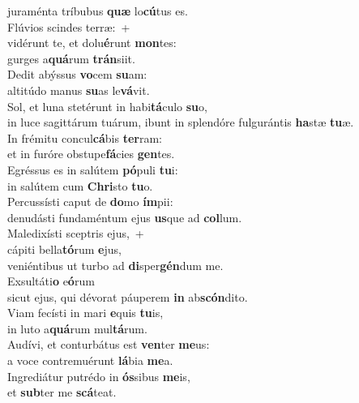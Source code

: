 \evenverse juraménta tríbubus \textbf{quæ} lo\textbf{cú}tus es.\\
\oddverse Flúvios scindes terræ:~+\\
\oddverse  vidérunt te, et dolu\textbf{é}runt \textbf{mon}tes:~\*\\
\oddverse gurges a\textbf{quá}rum \textbf{trán}siit.\\
\evenverse Dedit abýssus \textbf{vo}cem \textbf{su}am:~\*\\
\evenverse altitúdo manus \textbf{su}as le\textbf{vá}vit.\\
\oddverse Sol, et luna stetérunt in habi\textbf{tá}culo \textbf{su}o,~\*\\
\oddverse in luce sagittárum tuárum, ibunt in splendóre fulgurántis \textbf{ha}stæ \textbf{tu}æ.\\
\evenverse In frémitu concul\textbf{cá}bis \textbf{ter}ram:~\*\\
\evenverse et in furóre obstupe\textbf{fá}cies \textbf{gen}tes.\\
\oddverse Egréssus es in salútem \textbf{pó}puli \textbf{tu}i:~\*\\
\oddverse in salútem cum \textbf{Chri}sto \textbf{tu}o.\\
\evenverse Percussísti caput de \textbf{do}mo \textbf{ím}pii:~\*\\
\evenverse denudásti fundaméntum ejus \textbf{us}que ad \textbf{col}lum.\\
\oddverse Maledixísti sceptris ejus,~+\\
\oddverse  cápiti bella\textbf{tó}rum \textbf{e}jus,~\*\\
\oddverse veniéntibus ut turbo ad \textbf{di}sper\textbf{gén}dum me.\\
\evenverse Exsultáti\textbf{o} e\textbf{ó}rum~\*\\
\evenverse sicut ejus, qui dévorat páuperem \textbf{in} ab\textbf{scón}dito.\\
\oddverse Viam fecísti in mari \textbf{e}quis \textbf{tu}is,~\*\\
\oddverse in luto a\textbf{quá}rum mul\textbf{tá}rum.\\
\evenverse Audívi, et conturbátus est \textbf{ven}ter \textbf{me}us:~\*\\
\evenverse a voce contremuérunt \textbf{lá}bia \textbf{me}a.\\
\oddverse Ingrediátur putrédo in \textbf{ós}sibus \textbf{me}is,~\*\\
\oddverse et \textbf{sub}ter me \textbf{scá}teat.\\
